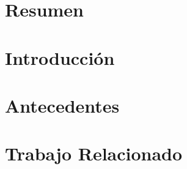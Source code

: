\documentclass[12pt,spanish]{book}
\begin{document}


\newpage{}
\cleardoublepage

\tableofcontents
\renewcommand{\listfigurename}{Índice de Figuras}
\renewcommand{\listtablename}{Índice de Tablas}
\listoffigures
\listoftables

\newpage
\chapter*{Resumen}
%

\newpage
\cleardoublepage




\chapter{Introducción}\label{cap:Intro}


\chapter{Antecedentes}

\label{ch:antecedentes}

\chapter{Trabajo Relacionado}

\end{document}
